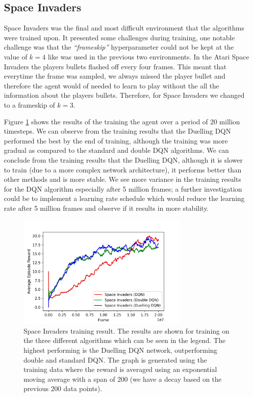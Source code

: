 \subsection{Space Invaders}
Space Invaders was the final and most difficult environment that the algorithms were trained upon. It presented some challenges during training, one notable challenge was that the \textit{``frameskip''} hyperparameter could not be kept at the value of $k = 4$ like was used in the previous two environments. In the Atari Space Invaders the players bullets flashed off every four frames. This meant that everytime the frame was sampled, we always missed the player bullet and therefore the agent would of needed to learn to play without the all the information about the players bullets. Therefore, for Space Invaders we changed to a frameskip of $k = 3$.

Figure \ref{fig:si-train-results} shows the results of the training the agent over a period of 20 million timesteps. We can observe from the training results that the Duelling DQN performed the best by the end of training, although the training was more gradual as compared to the standard and double DQN algorithms. We can conclude from the training results that the Duelling DQN, although it is slower to train (due to a more complex network architecture), it performs better than other methods and is more stable. We see more variance in the training results for the DQN algorithm especially after 5 million frames; a further investigation could be to implement a learning rate schedule which would reduce the learning rate after 5 million frames and observe if it results in more stability.

\begin{figure}[htbp]
  \centering
  \includegraphics[width=0.75\textwidth]{chapters/chapter5/images/si_plot.jpg}
  \caption[Space Invaders training result plot]{Space Invaders training result. The results are shown for training on the three different algorithms which can be seen in the legend. The highest performing is the Duelling DQN network, outperforming double and standard DQN. The graph is generated using the training data where the reward is averaged using an exponential moving average with a span of 200 (we have a decay based on the previous 200 data points).
    \label{fig:si-train-results}
  }
\end{figure}

